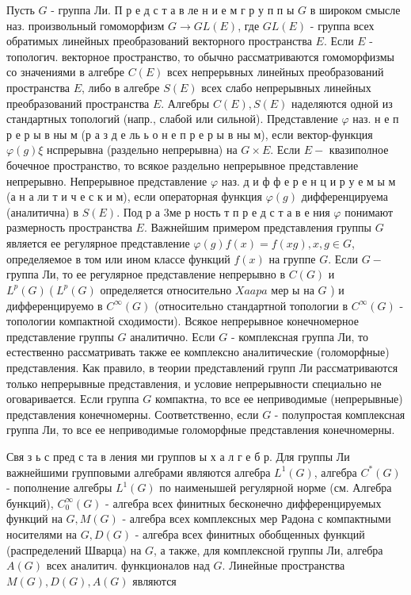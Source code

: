 \documentclass[10pt]{article}
\begin{document}
Пусть $G$ - группа Ли. П р е д с т а в ле н и е м г р у п п ы $G$ в широком смысле наз. произвольный гомоморфизм $G \rightarrow G L(E)$, где $G L(E)$ - группа всех обратимых линейных преобразований векторного пространства $E$. Если $E$ - топологич. векторное пространство, то обычно рассматриваются гомоморфизмы со значениями в алгебре $C(E)$ всех непрерьвных линейных преобразований пространства $E$, либо в алгебре $S(E)$ всех слабо непрерывных линейных преобразований пространства $E$. Алгебры $C(E), S(E)$ наделяются одной из стандартных топологий (напр., слабой или сильной). Представление $\varphi$ наз. н е п р е р ы в ны м (р а з д е ль ь о н е п р е р ы в ны м), если вектор-функция $\varphi(g) \xi$ нспрерывна (раздельно непрерывна) на $G \times E$. Если $E-$ квазиполное бочечное пространство, то всякое раздельно непрерывное представление непрерывно. Непрерывное представление $\varphi$ наз. д и ф ф е р е н ц и р у е м ы м (а н а ли т и ч е с к и м), если операторная функция $\varphi(g)$ дифференцируема (аналитична) в $S(E)$. Под р а 3ме р ность т п р е д с т а в е ния $\varphi$ понимают размерность пространства $E$. Важнейшим примером представления группы $G$ является ее регулярное представление $\varphi(g) f(x)=f(x g), x, g \in G$, определяемое в том или ином классе функций $f(x)$ на группе $G$. Если $G-$ группа Ли, то ее регулярное представление непрерывно в $C(G)$ и $L^{p}(G)\left(L^{p}(G)\right.$ определяется относительно $X a a p a$ мер ы на $G$ ) и дифференцируемо в $C^{\infty}(G)$ (относительно стандартной топологии в $C^{\infty}(G)$ - топологии компактной сходимости). Всякое непрерывное конечномерное представление группы $G$ аналитично. Если $G$ - комплексная группа Ли, то естественно рассматривать также ее комплексно аналитические (голоморфные) представления. Как правило, в теории представлений групп Ли рассматриваются только непрерывные представления, и условие непрерывности специально не оговаривается. Если группа $G$ компактна, то все ее неприводимые (непрерывные) представления конечномерны. Соответственно, если $G$ - полупростая комплексная группа Ли, то все ее неприводимые голоморфные представления конечномерны.



Свя з ь с пред с та в ления ми группов ы х а л г е б р. Для группы Ли важнейшими групповыми алгебрами являются алгебра $L^{1}(G)$, алгебра $C^{*}(G)$ - пополнение алгебры $L^{1}(G)$ по наименышей регулярной норме (см. Алгебра бункций), $C_{0}^{\infty}(G)$ - алгебра всех финитных бесконечно дифференцируемых функций на $G, M(G)$ - алгебра всех комплексных мер Радона с компактными носителями на $G, D(G)$ - алгебра всех финитных обобщенных функций (распределений Шварца) на $G$, а также, для комплексной группы Ли, алгебра $A(G)$ всех аналитич. функционалов над $G$. Линейные пространства $M(G), D(G), A(G)$ являются
\end{document}
